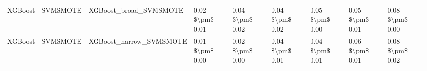\begin{tabular}{lllllllll}
                        XGBoost &                      SVMSMOTE &                       XGBoost\_broad\_SVMSMOTE & 0.02 \$\textbackslash pm\$ 0.01 &           0.04 \$\textbackslash pm\$ 0.02 &       0.04 \$\textbackslash pm\$ 0.02 &        0.05 \$\textbackslash pm\$ 0.00 &                         0.05 \$\textbackslash pm\$ 0.01 &     0.08 \$\textbackslash pm\$ 0.00 \\
                        XGBoost &                      SVMSMOTE &                      XGBoost\_narrow\_SVMSMOTE & 0.01 \$\textbackslash pm\$ 0.00 &           0.02 \$\textbackslash pm\$ 0.00 &       0.04 \$\textbackslash pm\$ 0.01 &        0.04 \$\textbackslash pm\$ 0.01 &                         0.06 \$\textbackslash pm\$ 0.01 &     0.08 \$\textbackslash pm\$ 0.02 \\
\bottomrule
\end{tabular}
